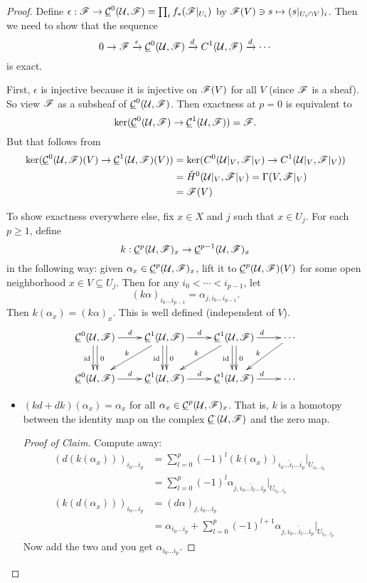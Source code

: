 \begin{proof}
Define $\epsilon: \mathscr{F} \to \underline{\mathcal{C}}^0(\mathcal{U},\mathscr{F})=\prod_i f_*(\mathscr{F}|_{U_i})$ by
$\mathscr{F}(V)\ni s\mapsto (s|_{U_i\cap V})_i$.  Then we need to show that
the sequence
\[
    0\to \mathscr{F} \xrightarrow{\epsilon} \underline{\mathcal{C}}^0(\mathcal{U},\mathscr{F})\xrightarrow{d}
    C^1(\mathcal{U},\mathscr{F}) \xrightarrow{d} \cdots
\]
is exact.

First, $\epsilon$ is injective because it is injective on $\mathscr{F}(V)$
for all $V$ (since $\mathscr{F}$ is a sheaf).  So view $\mathscr{F}$ as a subsheaf
of $\underline{\mathcal{C}}^0(\mathcal{U},\mathscr{F})$.  Then exactness at $p=0$ is equivalent to
\[
    \ker(\underline{\mathcal{C}}^0(\mathcal{U},\mathscr{F})\to \underline{\mathcal{C}}^1(\mathcal{U},\mathscr{F})) = \mathscr{F}.
\]
But that follows from
\begin{align*}
    \ker(\underline{\mathcal{C}}^0(\mathcal{U},\mathscr{F})(V)\to \underline{\mathcal{C}}^1(\mathcal{U},\mathscr{F})(V)) &= \ker(C^0(\mathcal{U}|_V,\mathscr{F}|_V)\to
    C^1(\mathcal{U}|_V,\mathscr{F}|_V))\\
     &= \check H^0(\mathcal{U}|_V,\mathscr{F}|_V) = \Gamma(V,\mathscr{F}|_V)\\
     &= \mathscr{F}(V)
\end{align*}

To show exactness everywhere else, fix $x\in X$ and $j$ such that
$x\in U_j$.  For each $p\ge 1$, define
\[
    k:\underline{\mathcal{C}}^p(\mathcal{U},\mathscr{F})_x\to \underline{\mathcal{C}}^{p-1}(\mathcal{U},\mathscr{F})_x
\]
in the following way: given $\alpha_x\in \underline{\mathcal{C}}^p(\mathcal{U},\mathscr{F})_x$, lift it
to $\underline{\mathcal{C}}^p(\mathcal{U},\mathscr{F})(V)$ for some open neighborhood $x\in V\subseteq
U_j$.  Then for any $i_0<\cdots<i_{p-1}$, let
\[
    (k\alpha)_{i_0\dots i_{p-1}} = \alpha_{j,i_0\dots i_{p-1}}.
\]
Then $k(\alpha_x) = (k\alpha)_x$.  This is well defined
(independent of $V$).
\[\xymatrix{
    \C^0(\U,\F)\ar[r]^d \ar@<-2pt>[d]_{\text{id}} \ar@<2pt>[d]^0 &
    \C^1(\U,\F)\ar[r]^d \ar[dl]_k \ar@<-2pt>[d]_{\text{id}} \ar@<2pt>[d]^0 &
    \C^1(\U,\F)\ar[r]^d \ar[dl]_k \ar@<-2pt>[d]_{\text{id}} \ar@<2pt>[d]^0 &
    \cdots \ar[dl]_k \\
    \C^0(\U,\F)\ar[r]^d & \C^1(\U,\F)\ar[r]^d & \C^1(\U,\F)\ar[r]^d & \cdots\\
}\]
 \vspace{-5mm}
\begin{itemize}
 \item[] \begin{claim} $(kd+dk)(\alpha_x) = \alpha_x$ for all
 $\alpha_x\in\underline{\mathcal{C}}^p(\mathcal{U},\mathscr{F})_x$.  That is, $k$ is a homotopy between
 the identity map on the complex $\underline{\mathcal{C}}^{\cdot}(\mathcal{U},\mathscr{F})$ and the zero
 map. \end{claim}
 \begin{proof}[Proof of Claim]
  Compute away:
  \begin{align*}
   (d(k(\alpha_x)))_{i_0\dots i_p} &= \sum_{l=0}^p (-1)^l
   (k(\alpha_x))_{i_0\dots \hat i_l \dots i_p}|_{U_{i_0\dots
   i_p}}\\
   &= \sum_{l=0}^p (-1)^l \alpha_{j,i_0\dots \hat i_l \dots
   i_p}|_{U_{i_0\dots i_p}}\\
   (k(d(\alpha_x)))_{i_0\dots i_p} &= (d\alpha)_{j,i_0\dots i_p}\\
   &= \alpha_{i_0\dots i_p} +
   \sum_{l=0}^p (-1)^{l+1}\alpha_{j,i_0\dots \hat i_l \dots
   i_p}|_{U_{i_0\dots i_p}}
  \end{align*}
  Now add the two and you get $\alpha_{i_0\dots i_p}$.
 \renewcommand{\qedsymbol}{$\square_{\text{Claim}}$}
 \end{proof}
\end{itemize}


\end{proof}
